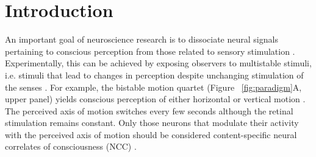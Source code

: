 \section{Introduction}
An important goal of neuroscience research is to dissociate neural signals pertaining to conscious perception from those related to sensory stimulation \parencite{Logothetis1989, Rees2007}. Experimentally, this can be achieved by exposing observers to multistable stimuli, i.e. stimuli that lead to changes in perception despite unchanging stimulation of the senses \parencite{Leopold1999, Sterzer2009, Brascamp2018}. For example, the bistable motion quartet (Figure ~\ref{fig:paradigm}A, upper panel) yields conscious perception of either horizontal or vertical motion \parencite{Ramachandran1985}. The perceived axis of motion switches every few seconds although the retinal stimulation remains constant. Only those neurons that modulate their activity with the perceived axis of motion should be considered content-specific neural correlates of consciousness (NCC) \parencite{Metzinger2000, Koch2016}.

